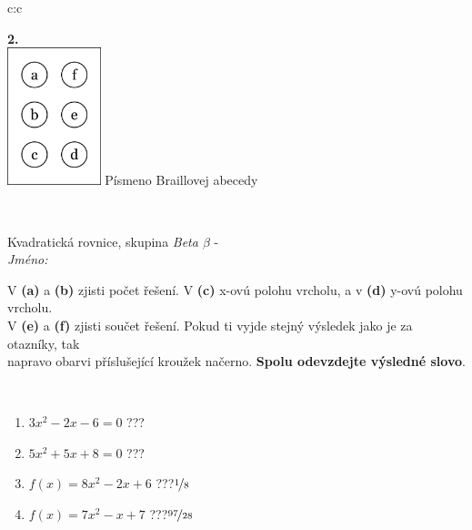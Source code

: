 \documentclass[10pt]{report}
\begin{document}
\begin{tabular}{c:c}
\begin{minipage}[c][104.5mm][t]{0.5\linewidth}
\begin{center}
\begin{minipage}{0.20\linewidth}
\begin{center}
{\Huge\bfseries 2.} \\[2mm]
\includegraphics[height=40mm]{../images/braille.png}
{\small Písmeno Braillovej abecedy}
\end{center}
\end{minipage}
\end{center}
\end{minipage}
\\ \hdashline
\begin{minipage}[c][104.5mm][t]{0.5\linewidth}
\begin{center}
\vspace{7mm}
{\huge Kvadratická rovnice, skupina \textit{Beta $\beta$} -}\\[5mm]
\textit{Jméno:}\phantom{xxxxxxxxxxxxxxxxxxxxxxxxxxxxxxxxxxxxxxxxxxxxxxxxxxxxxxxxxxxxxxxxx}\\[5mm]
\begin{minipage}{0.95\linewidth}
\begin{center}
V \textbf{(a)} a \textbf{(b)} zjisti počet řešení. V \textbf{(c)} x-ovú polohu vrcholu, a v \textbf{(d)} y-ovú polohu vrcholu.\\V \textbf{(e)} a \textbf{(f)} zjisti součet řešení. Pokud ti vyjde stejný výsledek jako je za otazníky, tak\\napravo obarvi příslušející kroužek načerno. \textbf{Spolu odevzdejte výsledné slovo}.
\end{center}
\end{minipage}
\\[1mm]
\begin{minipage}{0.79\linewidth}
\begin{center}
\begin{varwidth}{\linewidth}
\begin{enumerate}
\Large
\item $3x^2-2x-6=0$\quad \dotfill\; ???\;\dotfill {}
\item $5x^2+5x+8=0$\quad \dotfill\; ???\;\dotfill {}
\item $f(x)=8x^2-2x+6$\quad \dotfill\; ???\;\dotfill \quad $\nicefrac{1}{8}$
\item $f(x)=7x^2-x+7$\quad \dotfill\; ???\;\dotfill \quad $\nicefrac{97}{28}$

\end{enumerate}
\end{varwidth}
\end{center}
\end{minipage}
\end{center}
\end{minipage}
\end{tabular}
\end{document}
